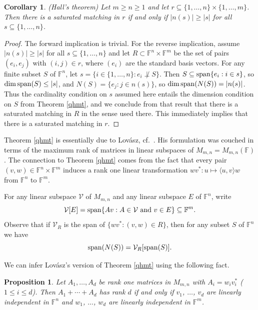 \documentclass{amsart}
\newtheorem{cor}[thm]{Corollary}
\newtheorem{prop}[thm]{Proposition}
\theoremstyle{definition}
\begin{document}
\begin{cor} \label{qhmtc} (Hall's theorem)
Let $m \geq n \geq 1$ and let $r \subseteq \{1, \ldots, n\}\times \{1, \ldots, m\}$. Then there is a saturated matching in $r$ if and only if $|n(s)| \geq |s|$ for all $s \subseteq \{1, \ldots, n\}$.
\end{cor}

\begin{proof}
The forward implication is trivial. For the reverse implication, assume $|n(s)| \geq |s|$ for all $s \subseteq \{1, \ldots, n\}$ and let $R \subset \mathbb{F}^n \times \mathbb{F}^m$ be the set of pairs $(e_i, e_j)$ with $(i,j) \in r$, where $(e_i)$ are the standard basis vectors. For any finite subset $S$ of $\mathbb{F}^n$, let $s = \{i \in \{1, \ldots, n\}: e_i \not\perp S\}$. Then $S \subseteq {\rm span}\{e_i: i \in s\}$, so ${\rm dim}\, {\rm span}(S) \leq |s|$, and $N(S) = \{e_j: j \in n(s)\}$, so ${\rm dim}\, {\rm span}(N(S)) = |n(s)|$. Thus the cardinality condition on $s$ assumed here entails the dimension condition on $S$ from Theorem \ref{qhmt}, and we conclude from that result that there is a saturated matching in $R$ in the sense used there. This immediately implies that there is a saturated matching in $r$.
\end{proof}

Theorem \ref{qhmt} is essentially due to Lovász, cf.\ \cite[Theorem 1*]{lovasz}. His formulation was couched in terms of the maximum rank of matrices in linear subspaces of $M_{m,n} = M_{m,n}(\mathbb{F})$. The connection to Theorem \ref{qhmt} comes from the fact that every pair $(v,w) \in \mathbb{F}^n\times\mathbb{F}^m$ induces a rank one linear transformation $wv^*: u \mapsto \langle u,v\rangle w$ from $\mathbb{F}^n$ to $\mathbb{F}^m$.

For any linear subspace $\mathcal{V}$ of $M_{m,n}$ and any linear subspace $E$ of $\mathbb{F}^n$, write
$$\mathcal{V}[E] = {\rm span}\{Av: A \in \mathcal{V}\,\,{\rm and}\,\, v \in E\} \subseteq \mathbb{F}^m.$$ Observe that if $\mathcal{V}_R$ is the span of $\{wv^*: (v,w) \in R\}$, then for any subset $S$ of $\mathbb{F}^n$ we have $${\rm span}(N(S)) = \mathcal{V}_R[{\rm span}(S)].$$

We can infer Lovász's version of Theorem \ref{qhmt} using the following fact.

\begin{prop}\label{lafact}
Let $A_1, \ldots, A_d$ be rank one matrices in $M_{m,n}$ with $A_i = w_iv_i^*$ ($1 \leq i \leq d$). Then $A_1 + \cdots + A_d$ has rank $d$ if and only if $v_1$, $\ldots$, $v_d$ are linearly independent in $\mathbb{F}^n$ and $w_1$, $\ldots$, $w_d$ are linearly independent in $\mathbb{F}^m$.
\end{prop}
\end{document}
